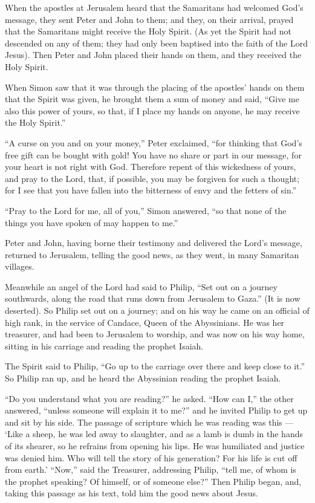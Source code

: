  When the apostles at Jerusalem heard that the Samaritans
had welcomed God's message, they sent Peter and John to them;
 and they, on their arrival, prayed that the Samaritans
might receive the Holy Spirit.  (As yet the Spirit had not
descended on any of them; they had only been baptised into the faith of
the Lord Jesus).  Then Peter and John placed their hands on
them, and they received the Holy Spirit.

 When Simon saw that it was through the placing of the
apostles' hands on them that the Spirit was given, he brought them a sum
of money and said,  ``Give me also this power of yours, so
that, if I place my hands on anyone, he may receive the Holy Spirit.''

 ``A curse on you and on your money,'' Peter exclaimed,
``for thinking that God's free gift can be bought with gold!
 You have no share or part in our message, for your heart
is not right with God.  Therefore repent of this wickedness
of yours, and pray to the Lord, that, if possible, you may be forgiven
for such a thought;  for I see that you have fallen into
the bitterness of envy and the fetters of sin.''

 ``Pray to the Lord for me, all of you,'' Simon answered,
``so that none of the things you have spoken of may happen to me.''

 Peter and John, having borne their testimony and delivered
the Lord's message, returned to Jerusalem, telling the good news, as
they went, in many Samaritan villages.

 Meanwhile an angel of the Lord had said to Philip, ``Set
out on a journey southwards, along the road that runs down from
Jerusalem to Gaza.'' (It is now deserted).  So Philip set
out on a journey; and on his way he came on an official of high rank, in
the service of Candace, Queen of the Abyssinians. He was her treasurer,
and had been to Jerusalem to worship,  and was now on his
way home, sitting in his carriage and reading the prophet Isaiah.

 The Spirit said to Philip, ``Go up to the carriage over
there and keep close to it.''  So Philip ran up, and he
heard the Abyssinian reading the prophet Isaiah.

``Do you understand what you are reading?'' he asked. 
``How can I,'' the other answered, ``unless someone will explain it to
me?'' and he invited Philip to get up and sit by his side. 
The passage of scripture which he was reading was this --- `Like a
sheep, he was led away to slaughter, and as a lamb is dumb in the hands
of its shearer, so he refrains from opening his lips.  He
was humiliated and justice was denied him. Who will tell the story of
his generation? For his life is cut off from earth.' 
``Now,'' said the Treasurer, addressing Philip, ``tell me, of whom is
the prophet speaking? Of himself, or of someone else?'' 
Then Philip began, and, taking this passage as his text, told him the
good news about Jesus.

